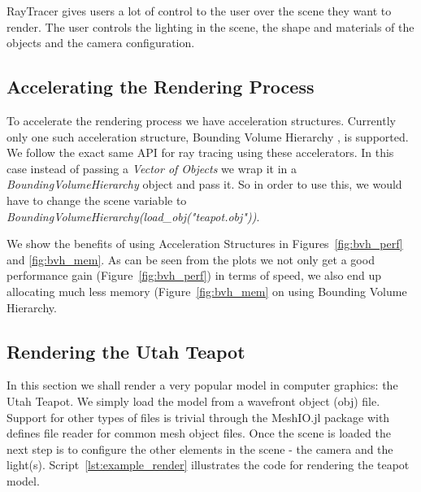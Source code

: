\documentclass{juliacon}
\begin{document}
RayTracer gives users a lot of control to the user over the scene they want to render. The user controls the lighting in the scene, the shape and materials of the objects and the camera configuration.

\subsection{Accelerating the Rendering Process}

To accelerate the rendering process we have acceleration structures. Currently only one such acceleration structure, Bounding Volume Hierarchy \cite{Kay:1986:RTC:15922.15916}, is supported. We follow the exact same API for ray tracing using these accelerators. In this case instead of passing a \textit{Vector of Objects} we wrap it in a \textit{BoundingVolumeHierarchy} object and pass it. So in order to use this, we would have to change the scene variable to \textit{BoundingVolumeHierarchy(load\_obj("teapot.obj"))}.

We show the benefits of using Acceleration Structures in Figures~\ref{fig:bvh_perf} and \ref{fig:bvh_mem}. As can be seen from the plots we not only get a good performance gain (Figure~\ref{fig:bvh_perf}) in terms of speed, we also end up allocating much less memory (Figure~\ref{fig:bvh_mem} on using Bounding Volume Hierarchy.

\subsection{Rendering the Utah Teapot}

In this section we shall render a very popular model in computer graphics: the Utah Teapot. We simply load the model from a wavefront object (obj) file. Support for other types of files is trivial through the MeshIO.jl package with defines file reader for common mesh object files. Once the scene is loaded the next step is to configure the other elements in the scene - the camera and the light(s). Script~\ref{lst:example_render} illustrates the code for rendering the teapot model.
\end{document}
